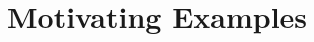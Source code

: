 \documentclass[sigconf]{acmart}
\begin{document}


\section{Motivating Examples}
\label{sec:motivation}
\end{document}
